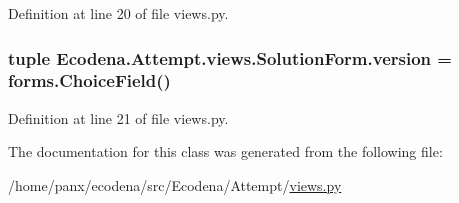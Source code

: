 Definition at line 20 of file views.py.

\hypertarget{class_ecodena_1_1_attempt_1_1views_1_1_solution_form_a77e5671273cfb3207fd55e2b3defd321}{
\subsubsection[{version}]{\setlength{\rightskip}{0pt plus 5cm}tuple {\bf Ecodena.Attempt.views.SolutionForm.version} = forms.ChoiceField()}}
\label{df/d81/class_ecodena_1_1_attempt_1_1views_1_1_solution_form_a77e5671273cfb3207fd55e2b3defd321}


Definition at line 21 of file views.py.



The documentation for this class was generated from the following file:\begin{DoxyCompactItemize}
\item 
/home/panx/ecodena/src/Ecodena/Attempt/\hyperlink{_attempt_2views_8py}{views.py}\end{DoxyCompactItemize}
